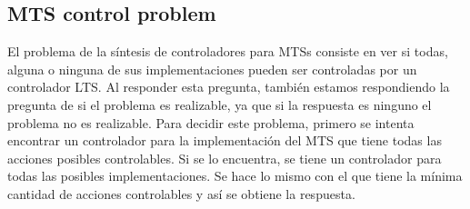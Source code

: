 \subsection{MTS	control problem}

El problema de la síntesis de controladores para MTSs consiste en ver si todas, alguna o ninguna de sus implementaciones
pueden ser controladas por un controlador LTS. Al responder esta pregunta, también estamos respondiendo la pregunta de
si el problema es realizable, ya que si la respuesta es ninguno el problema no es realizable. Para decidir este problema,
primero se intenta encontrar un controlador para la implementación del MTS que tiene todas las acciones posibles controlables.
Si se lo encuentra, se tiene un controlador para todas las posibles implementaciones. Se hace lo mismo con el que tiene la
mínima cantidad de acciones controlables y así se obtiene la respuesta.